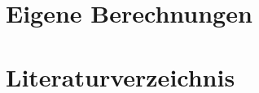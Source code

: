 \documentclass[12pt,a4paper,twoside]{article}
\begin{document}
\newpage
\renewcommand{\thesection}{\Alph{section}}
\setcounter{section}{0} %
\section{Eigene Berechnungen}
\section{Literaturverzeichnis}

{}
\end{document}
